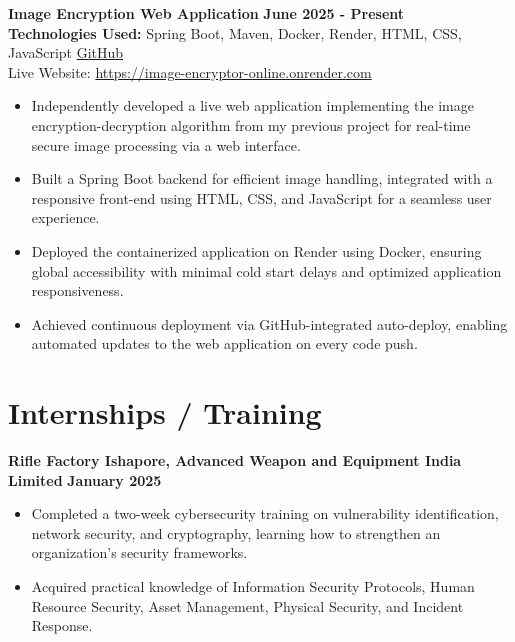 \documentclass[a4paper,10pt]{article}
\begin{document}
\vspace{0.5em}


\textbf{Image Encryption Web Application} \hfill {\textbf{June 2025 - Present}}\\[0.5em]
\textbf{Technologies Used:} Spring Boot, Maven, Docker, Render, HTML, CSS, JavaScript \hfill {\href{https://github.com/subhrasmit17/Image-Encryption-Online}{GitHub}}\\[0.5em]
Live Website: \href{https://image-encryptor-online.onrender.com}{https://image-encryptor-online.onrender.com}

\begin{itemize}[leftmargin=*]
    \item Independently developed a live web application implementing the image encryption-decryption algorithm from my previous project for real-time secure image processing via a web interface.
    \item Built a Spring Boot backend for efficient image handling, integrated with a responsive front-end using HTML, CSS, and JavaScript for a seamless user experience.
    \item Deployed the containerized application on Render using Docker, ensuring global accessibility with minimal cold start delays and optimized application responsiveness.
    \item Achieved continuous deployment via GitHub-integrated auto-deploy, enabling automated updates to the web application on every code push.
\end{itemize}






\section*{Internships / Training}
\vspace{0.1em}
\textbf{Rifle Factory Ishapore, Advanced Weapon and Equipment India Limited} \hfill {\textbf{January 2025}}\\[-1.4em]

\begin{itemize}[leftmargin=*]
    \item Completed a two-week cybersecurity training on vulnerability identification, network security, and cryptography, learning how to strengthen an organization’s security frameworks.
    \item Acquired practical knowledge of Information Security Protocols, Human Resource Security, Asset Management, Physical Security, and Incident Response.
\end{itemize}
\end{document}
